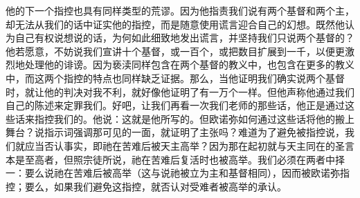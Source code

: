 他的下一个指控也具有同样类型的荒谬。因为他指责我们说有两个基督和两个主，却无法从我们的话中证实他的指控，而是随意使用谎言迎合自己的幻想。既然他认为自己有权说想说的话，为何如此细致地发出谎言，并坚持我们只说两个基督的？他若愿意，不妨说我们宣讲十个基督，或一百个，或把数目扩展到一千，以便更激烈地处理他的诽谤。因为亵渎同样包含在两个基督的教义中，也包含在更多的教义中，而这两个指控的特点也同样缺乏证据。那么，当他证明我们确实说两个基督时，就让他的判决对我不利，就好像他证明了有一万个一样。但他声称他通过我们自己的陈述来定罪我们。好吧，让我们再看一次我们老师的那些话，他正是通过这些话来指控我们的。他说：这就是他所写的。但欧诺弥如何通过这些话将他的搬上舞台？说指示词强调那可见的一面，就证明了主张吗？难道为了避免被指控说，我们就应当否认事实，即祂在苦难后被天主高举？因为那在起初就与天主同在的圣言本是至高者，但照宗徒所说，祂在苦难后复活时也被高举。我们必须在两者中择一：要么说祂在苦难后被高举（这与说祂被立为主和基督相同），因而被欧诺弥指控；要么，如果我们避免这指控，就否认对受难者被高举的承认。\par

